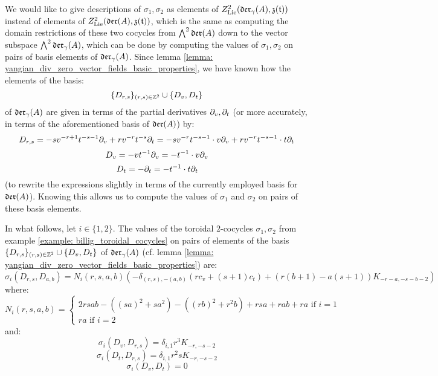         We would like to give descriptions of $\sigma_1, \sigma_2$ as elements of $Z^2_{\mathrm{Lie}}(\mathfrak{der}_{\gamma}(A), \mathfrak{z}(\mathfrak{t}))$ instead of elements of $Z^2_{\mathrm{Lie}}(\mathfrak{der}(A), \mathfrak{z}(\mathfrak{t}))$, which is the same as computing the domain restrictions of these two cocycles from $\bigwedge^2 \mathfrak{der}(A)$ down to the vector subspace $\bigwedge^2 \mathfrak{der}_{\gamma}(A)$, which can be done by computing the values of $\sigma_1, \sigma_2$ on pairs of basis elements of $\mathfrak{der}_{\gamma}(A)$. Since lemma \ref{lemma: yangian_div_zero_vector_fields_basic_properties}, we have known how the elements of the  basis:
            $$\{D_{r, s}\}_{(r, s) \in \mathbb{Z}^2} \cup \{D_v, D_t\}$$
        of $\mathfrak{der}_{\gamma}(A)$ are given in terms of the partial derivatives $\partial_v, \partial_t$ (or more accurately, in terms of the aforementioned basis of $\mathfrak{der}(A)$) by:
            $$D_{r, s} = -s v^{-r + 1} t^{-s - 1} \partial_v + r v^{-r} t^{-s} \partial_t = -s v^{-r} t^{-s - 1} \cdot v\partial_v + r v^{-r} t^{-s - 1} \cdot t\partial_t$$
            $$D_v = -v t^{-1} \partial_v = -t^{-1} \cdot v\partial_v$$
            $$D_t = -\partial_t = -t^{-1} \cdot t\partial_t$$
        (to rewrite the expressions slightly in terms of the currently employed basis for $\mathfrak{der}(A)$). Knowing this allows us to compute the values of $\sigma_1$ and $\sigma_2$ on pairs of these basis elements.
        \begin{lemma} \label{lemma: billig_toroidal_cocycles_on_yangian_div_zero_vector_fields}
            In what follows, let $i \in \{1, 2\}$. The values of the toroidal $2$-cocycles $\sigma_1, \sigma_2$ from example \ref{example: billig_toroidal_cocycles} on pairs of elements of the basis $\{D_{r, s}\}_{(r, s) \in \mathbb{Z}^2} \cup \{D_v, D_t\}$ of $\mathfrak{der}_{\gamma}(A)$ (cf. lemma \ref{lemma: yangian_div_zero_vector_fields_basic_properties}) are:
                $$\sigma_i(D_{r, s}, D_{a, b}) = N_i(r, s, a, b) \left( -\delta_{(r, s), -(a, b)} (r c_v + (s + 1) c_t) + ( r(b + 1) - a(s + 1) )K_{-r - a, -s - b - 2} \right)$$
            where:
                $$
                    N_i(r, s, a, b) =
                    \begin{cases}
                        \text{$2 rsab - ( (sa)^2 + s a^2 ) - ( (rb)^2 + r^2 b ) + rsa + rab + ra$ if $i = 1$}
                        \\
                        \text{$ra$ if $i = 2$}
                    \end{cases}
                $$
            and:
                $$\sigma_i(D_v, D_{r, s}) = \delta_{i, 1} r^3 K_{-r, -s - 2}$$
                $$\sigma_i(D_t, D_{r, s}) = \delta_{i, 1} r^2 s K_{-r, -s - 2}$$
                $$\sigma_i(D_v, D_t) = 0$$
        \end{lemma}
